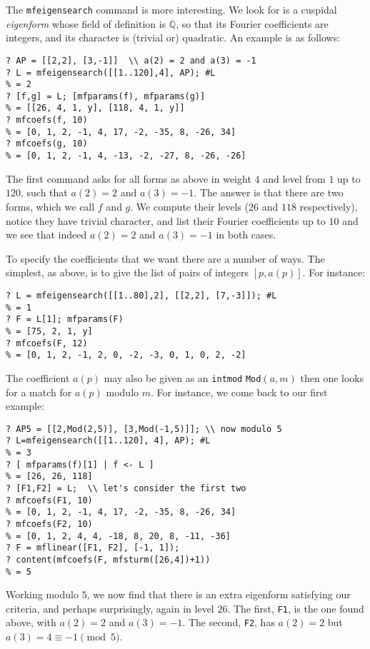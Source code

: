 \documentclass[11pt]{article}
\newcommand{\Q}{{\mathbb Q}}
\def\kbd#1{{\tt #1}}
\begin{document}
The \kbd{mfeigensearch} command is more interesting. We look for is a
cuspidal \emph{eigenform} whose field of definition is $\Q$, so that its
Fourier coefficients are integers, and its character is (trivial or)
quadratic. An example is as follows:
\begin{verbatim}
? AP = [[2,2], [3,-1]]  \\ a(2) = 2 and a(3) = -1
? L = mfeigensearch([[1..120],4], AP); #L
% = 2
? [f,g] = L; [mfparams(f), mfparams(g)]
% = [[26, 4, 1, y], [118, 4, 1, y]]
? mfcoefs(f, 10)
% = [0, 1, 2, -1, 4, 17, -2, -35, 8, -26, 34]
? mfcoefs(g, 10)
% = [0, 1, 2, -1, 4, -13, -2, -27, 8, -26, -26]
\end{verbatim}

The first command asks for all forms as above in weight $4$ and level from
$1$ up to $120$, such that $a(2)=2$ and $a(3)=-1$. The answer is that there
are two forms, which we call $f$ and $g$. We compute their levels ($26$ and
$118$ respectively), notice they have trivial character, and list their
Fourier coefficients up to $10$ and we see that indeed $a(2)=2$ and $a(3)=-1$
in both cases.

To specify the coefficients that we want there are a number of ways. The
simplest, as above, is to give the list of pairs of integers $[p,a(p)]$.
For instance:
\begin{verbatim}
? L = mfeigensearch([[1..80],2], [[2,2], [7,-3]]); #L
% = 1
? F = L[1]; mfparams(F)
% = [75, 2, 1, y]
? mfcoefs(F, 12)
% = [0, 1, 2, -1, 2, 0, -2, -3, 0, 1, 0, 2, -2]
\end{verbatim}

The coefficient $a(p)$ may also be given as an \kbd{intmod} \kbd{Mod}$(a,m)$
then one looks for a match for $a(p)$ modulo $m$. For instance, we come
back to our first example:
\begin{verbatim}
? AP5 = [[2,Mod(2,5)], [3,Mod(-1,5)]]; \\ now modulo 5
? L=mfeigensearch([[1..120], 4], AP); #L
% = 3
? [ mfparams(f)[1] | f <- L ]
% = [26, 26, 118]
? [F1,F2] = L;  \\ let's consider the first two
? mfcoefs(F1, 10)
% = [0, 1, 2, -1, 4, 17, -2, -35, 8, -26, 34]
? mfcoefs(F2, 10)
% = [0, 1, 2, 4, 4, -18, 8, 20, 8, -11, -36]
? F = mflinear([F1, F2], [-1, 1]);
? content(mfcoefs(F, mfsturm([26,4])+1))
% = 5
\end{verbatim}
Working modulo $5$, we now find that there is an extra eigenform satisfying
our criteria, and perhaps surprisingly, again in level $26$. The first,
\kbd{F1}, is the one found above, with $a(2)=2$ and $a(3)=-1$. The second,
\kbd{F2}, has $a(2)=2$ but $a(3)=4\equiv-1\pmod5$.
\end{document}
